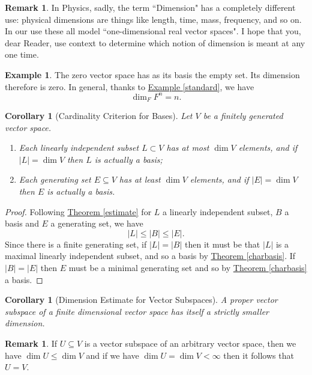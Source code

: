 \documentclass[11pt]{amsbook}
\newtheorem{corollary}[theorem]{Corollary}
\theoremstyle{definition}
\newtheorem{rem}[theorem]{Remark}
\newtheorem{ex}[theorem]{Example}
\begin{document}
\begin{rem}\label{physdim} In Physics, sadly, the term ``Dimension" has a completely different use: physical dimensions are things like length, time, mass, frequency, and so on. In our use these all model ``one-dimensional real vector spaces". I hope that you, dear Reader, use context to determine which notion of dimension is meant at any one time.
\end{rem}

\begin{ex} The zero vector space has as its basis the empty set. Its dimension therefore is zero. In general, thanks to \hyperref[standard]{Example \ref{standard}}, we have $$\dim_F F^n = n.$$\end{ex}

\begin{corollary}[Cardinality Criterion for Bases] \label{cardbasis}  Let $V$ be a finitely generated vector space.
\begin{enumerate}
\item Each linearly independent subset $L\subset V$ has at most $\dim V$ elements, and if $|L| = \dim V$ then $L$ is actually a basis;
\item Each generating set $E\subseteq V$ has at least $\dim V$ elements, and if $|E| = \dim V$ then $E$ is actually a basis.
\end{enumerate}
\end{corollary}
\begin{proof} Following \hyperref[estimate]{Theorem \ref{estimate}} for $L$ a linearly independent subset, $B$ a basis and $E$ a generating set, we have $$|L| \leqslant |B| \leqslant |E|.$$ Since there is a finite generating set, if $|L|= |B|$ then it must be that $|L|$ is a maximal linearly independent subset, and so a basis by \hyperref[charbasis]{Theorem \ref{charbasis}}. If $|B| = |E|$ then $E$ must be a minimal generating set and so by \hyperref[charbasis]{Theorem \ref{charbasis}} a basis.
\end{proof}

\begin{corollary}[Dimension Estimate for Vector Subspaces] \label{subspacesmall} A proper vector subspace of a finite dimensional vector space has itself a strictly smaller dimension.
\end{corollary}

\begin{rem}\label{dim&contain} If $U\subseteq V$ is a vector subspace of an arbitrary vector space, then we have $\dim U \leqslant  \dim V$ and if we have $\dim U = \dim V < \infty$ then it follows that $U=V$.
\end{rem}
\end{document}
